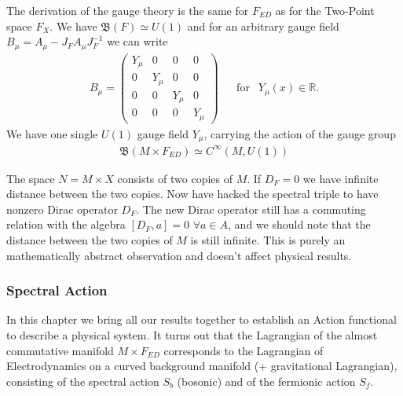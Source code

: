 The derivation of the gauge theory is the same for $F_{ED}$ as for the
Two-Point space $F_X$. We have $\mathfrak{B}(F) \simeq U(1)$ and for an
arbitrary gauge field $B_\mu = A_\mu - J_F A_\mu J_F^{-1}$ we can write
\begin{align} \label{field}
    B_\mu =
    \begin{pmatrix}
        Y_\mu & 0 & 0 & 0 \\
        0 & Y_\mu& 0 & 0 \\
        0 & 0 & Y_\mu& 0 \\
        0 & 0 & 0 & Y_\mu
    \end{pmatrix} \;\;\;\;\;\ \text{for} \;\;\ Y_\mu (x) \in \mathbb{R}.
\end{align}
We have one single $U(1)$ gauge field $Y_\mu$, carrying the action of the
gauge group
\begin{align}
   \text{$\mathfrak{B}$}(M\times F_{ED}) \simeq C^\infty(M, U(1))
\end{align}

The space $N = M\times X$ consists of two copies of $M$.
If $D_F = 0$ we have infinite distance between the two copies. Now have
hacked the spectral triple to have nonzero Dirac operator $D_F$. The new
Dirac operator still has a commuting relation with the algebra $[D_F, a] = 0$
$\forall a \in A$, and we should note that the distance between the two
copies of $M$ is still infinite. This is purely an mathematically abstract
observation and doesn't affect physical results.

\subsubsection{Spectral Action}
In this chapter we bring all our results together to establish an
Action functional to describe a physical system. It turns out that
the Lagrangian of the almost commutative manifold $M\times F_{ED}$
corresponds to the Lagrangian of Electrodynamics on a curved
background manifold (+ gravitational Lagrangian), consisting of the spectral
action $S_b$ (bosonic) and of the fermionic action $S_f$.


